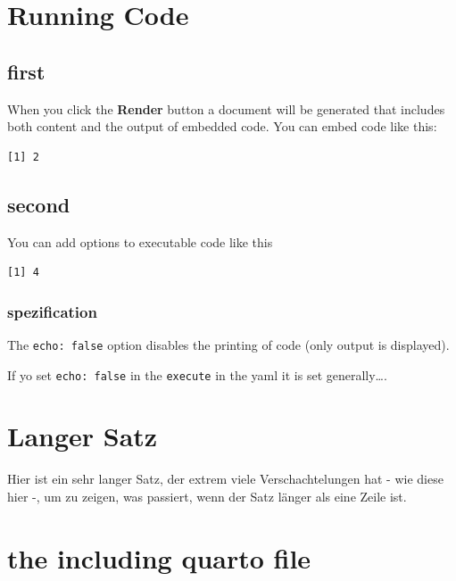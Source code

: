 \documentclass[
  11pt,
]{scrbook}
\begin{document}
\hypertarget{running-code}{%
\chapter{Running Code}\label{running-code}}

\hypertarget{first}{%
\section{first}\label{first}}

When you click the \textbf{Render} button a document will be generated
that includes both content and the output of embedded code. You can
embed code like this:

\begin{verbatim}
[1] 2
\end{verbatim}

\hypertarget{second}{%
\section{second}\label{second}}

You can add options to executable code like this

\begin{verbatim}
[1] 4
\end{verbatim}

\hypertarget{spezification}{%
\subsection{spezification}\label{spezification}}

The \texttt{echo:\ false} option disables the printing of code (only
output is displayed).

If yo set \texttt{echo:\ false} in the \texttt{execute} in the yaml it
is set generally\ldots.

\hypertarget{langer-satz}{%
\chapter{Langer Satz}\label{langer-satz}}

Hier ist ein sehr langer Satz, der extrem viele Verschachtelungen hat -
wie diese hier -, um zu zeigen, was passiert, wenn der Satz länger als
eine Zeile ist.

\hypertarget{the-including-quarto-file}{%
\chapter{the including quarto file}\label{the-including-quarto-file}}
\end{document}
